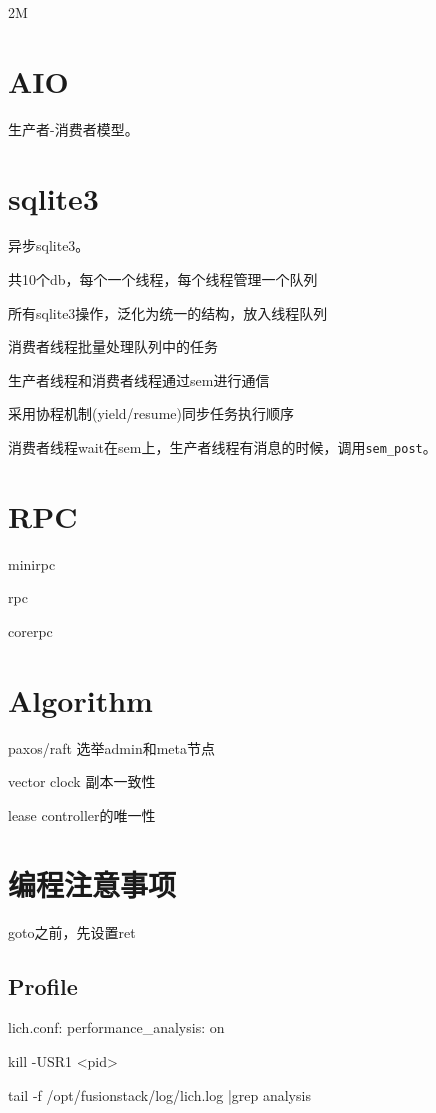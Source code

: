 2M

\section{AIO}

生产者-消费者模型。

\section{sqlite3}

异步sqlite3。

\begin{compactitem}
    \item 共10个db，每个一个线程，每个线程管理一个队列
    \item 所有sqlite3操作，泛化为统一的结构，放入线程队列
    \item 消费者线程批量处理队列中的任务
    \item 生产者线程和消费者线程通过sem进行通信
    \item 采用协程机制(yield/resume)同步任务执行顺序
\end{compactitem}

消费者线程wait在sem上，生产者线程有消息的时候，调用\verb|sem_post|。

\section{RPC}

\begin{compactitem}
    \item minirpc
    \item rpc
    \item corerpc
\end{compactitem}

\section{Algorithm}

\begin{compactitem}
    \item paxos/raft 选举admin和meta节点
    \item vector clock 副本一致性
    \item lease controller的唯一性
\end{compactitem}

\section{编程注意事项}

\begin{compactitem}
\item goto之前，先设置ret
\end{compactitem}

\subsection{Profile}

lich.conf: performance\_analysis: on

kill -USR1 <pid>

tail -f /opt/fusionstack/log/lich.log |grep analysis

